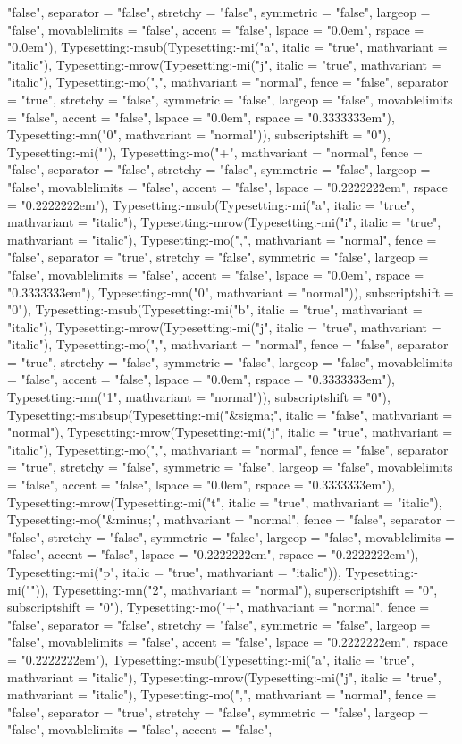 \documentclass{article}
\begin{document}
\begin{Maple Normal}
{\begin{Maple Normal}
{"false", separator = "false", stretchy = "false", symmetric = "false", largeop = "false", movablelimits = "false", accent = "false", lspace = "0.0em", rspace = "0.0em"), Typesetting:-msub(Typesetting:-mi("a", italic = "true", mathvariant = "italic"), Typesetting:-mrow(Typesetting:-mi("j", italic = "true", mathvariant = "italic"), Typesetting:-mo(",", mathvariant = "normal", fence = "false", separator = "true", stretchy = "false", symmetric = "false", largeop = "false", movablelimits = "false", accent = "false", lspace = "0.0em", rspace = "0.3333333em"), Typesetting:-mn("0", mathvariant = "normal")), subscriptshift = "0"), Typesetting:-mi(""), Typesetting:-mo("+", mathvariant = "normal", fence = "false", separator = "false", stretchy = "false", symmetric = "false", largeop = "false", movablelimits = "false", accent = "false", lspace = "0.2222222em", rspace = "0.2222222em"), Typesetting:-msub(Typesetting:-mi("a", italic = "true", mathvariant = "italic"), Typesetting:-mrow(Typesetting:-mi("i", italic = "true", mathvariant = "italic"), Typesetting:-mo(",", mathvariant = "normal", fence = "false", separator = "true", stretchy = "false", symmetric = "false", largeop = "false", movablelimits = "false", accent = "false", lspace = "0.0em", rspace = "0.3333333em"), Typesetting:-mn("0", mathvariant = "normal")), subscriptshift = "0"), Typesetting:-msub(Typesetting:-mi("b", italic = "true", mathvariant = "italic"), Typesetting:-mrow(Typesetting:-mi("j", italic = "true", mathvariant = "italic"), Typesetting:-mo(",", mathvariant = "normal", fence = "false", separator = "true", stretchy = "false", symmetric = "false", largeop = "false", movablelimits = "false", accent = "false", lspace = "0.0em", rspace = "0.3333333em"), Typesetting:-mn("1", mathvariant = "normal")), subscriptshift = "0"), Typesetting:-msubsup(Typesetting:-mi("&sigma;", italic = "false", mathvariant = "normal"), Typesetting:-mrow(Typesetting:-mi("j", italic = "true", mathvariant = "italic"), Typesetting:-mo(",", mathvariant = "normal", fence = "false", separator = "true", stretchy = "false", symmetric = "false", largeop = "false", movablelimits = "false", accent = "false", lspace = "0.0em", rspace = "0.3333333em"), Typesetting:-mrow(Typesetting:-mi("t", italic = "true", mathvariant = "italic"), Typesetting:-mo("&minus;", mathvariant = "normal", fence = "false", separator = "false", stretchy = "false", symmetric = "false", largeop = "false", movablelimits = "false", accent = "false", lspace = "0.2222222em", rspace = "0.2222222em"), Typesetting:-mi("p", italic = "true", mathvariant = "italic")), Typesetting:-mi("")), Typesetting:-mn("2", mathvariant = "normal"), superscriptshift = "0", subscriptshift = "0"), Typesetting:-mo("+", mathvariant = "normal", fence = "false", separator = "false", stretchy = "false", symmetric = "false", largeop = "false", movablelimits = "false", accent = "false", lspace = "0.2222222em", rspace = "0.2222222em"), Typesetting:-msub(Typesetting:-mi("a", italic = "true", mathvariant = "italic"), Typesetting:-mrow(Typesetting:-mi("j", italic = "true", mathvariant = "italic"), Typesetting:-mo(",", mathvariant = "normal", fence = "false", separator = "true", stretchy = "false", symmetric = "false", largeop = "false", movablelimits = "false", accent = "false", }
\end{Maple Normal}}
\end{Maple Normal}
\end{document}
